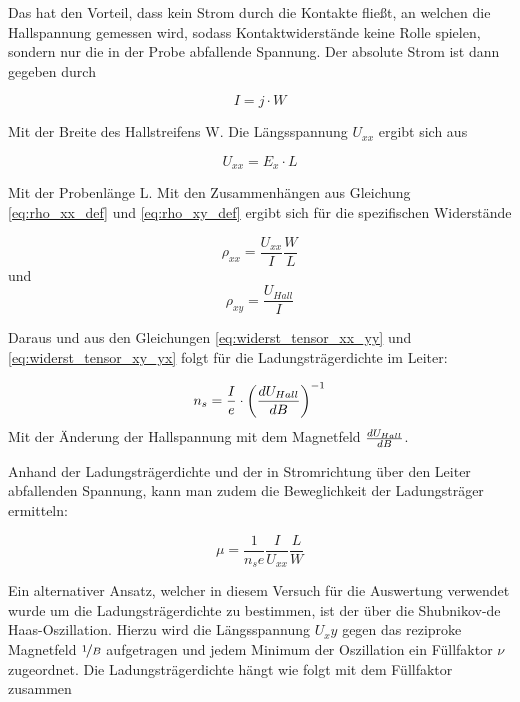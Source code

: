 Das hat den Vorteil, dass kein Strom durch die Kontakte fließt, an welchen die Hallspannung gemessen wird, sodass Kontaktwiderstände keine Rolle spielen, sondern nur die in der Probe abfallende Spannung. Der absolute Strom ist dann gegeben durch

\begin{equation}
I=j \cdot W
\label{eq:absoluter_Strom}
\end{equation}

Mit der Breite des Hallstreifens W. Die Längsspannung $U_{xx}$ ergibt sich aus

\begin{equation}
U_{xx}=E_x \cdot L
\label{eq:laengsspannung}
\end{equation}

Mit der Probenlänge L. Mit den Zusammenhängen aus Gleichung \ref{eq:rho_xx_def} und \ref{eq:rho_xy_def} ergibt sich für die spezifischen Widerstände

\begin{equation}
\rho_{xx}=\frac{U_{xx}}{I}\frac{W}{L}
\label{eq:rho_xx}
\end{equation}
und
\begin{equation}
\rho_{xy}=\frac{U_{Hall}}{I}
\label{eq:rho_xy}
\end{equation}

Daraus und aus den Gleichungen \ref{eq:widerst_tensor_xx_yy} und \ref{eq:widerst_tensor_xy_yx} folgt für die Ladungsträgerdichte im Leiter:
 
 \begin{equation}
 n_s=\frac{I}{e} \cdot \left( \frac{d U_{Hall}}{d B} \right)^{-1}
 \label{eq:ladungsdichte_steig}
 \end{equation}
 Mit der Änderung der Hallspannung mit dem Magnetfeld $\frac{d U_{Hall}}{d B}$. 
 
 Anhand der Ladungsträgerdichte und der in Stromrichtung über den Leiter abfallenden Spannung, kann man zudem die Beweglichkeit der Ladungsträger ermitteln:
 
 \begin{equation}
 \mu=\frac{1}{n_se}\frac{I}{U_{xx}}\frac{L}{W}
 \label{eq:bewegl_masse}
 \end{equation}
 
 Ein alternativer Ansatz, welcher in diesem Versuch für die Auswertung verwendet wurde um die Ladungsträgerdichte zu bestimmen, ist der über die Shubnikov-de Haas-Oszillation. Hierzu wird die Längsspannung $U_xy$ gegen das reziproke Magnetfeld $\nicefrac{1}{B}$ aufgetragen und jedem Minimum der Oszillation ein Füllfaktor $\nu$ zugeordnet. Die Ladungsträgerdichte hängt wie folgt mit dem Füllfaktor zusammen
 

